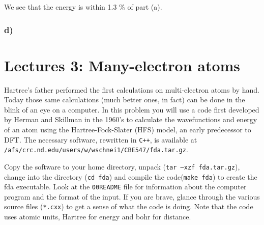 \documentclass[11pt]{article}
\begin{document}
We see that the energy is within 1.3 \% of part (a).

\subsubsection{d)}
\label{sec-1-1-4}


\section{Lectures 3: Many-electron atoms}
\label{sec-2}

Hartree’s father performed the first calculations on multi-electron atoms by hand. Today those same calculations (much better ones, in fact) can be done in the blink of an eye on a computer. In this problem you will use a code first developed by Herman and Skillman in the 1960’s to calculate the wavefunctions and energy of an atom using the Hartree-Fock-Slater (HFS) model, an early predecessor to DFT. The necessary software, rewritten in \texttt{C++}, is available at \verb~/afs/crc.nd.edu/users/w/wschnei1/CBE547/fda.tar.gz~.

Copy the software to your home directory, unpack (\verb~tar –xzf fda.tar.gz~), change into the directory (\verb~cd fda~) and compile the code(\verb~make fda~) to create the fda executable. Look at the \texttt{00README} file for information about the computer program and the format of the input. If you are brave, glance through the various source files (\verb~*.cxx~) to get a sense of what the code is doing. Note that the code uses atomic units, Hartree for energy and bohr for distance.
\end{document}
